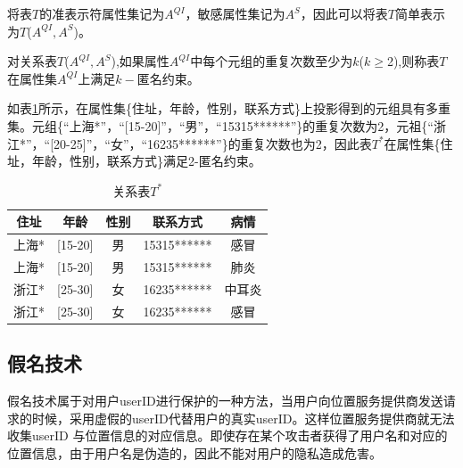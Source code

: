 将表$T$的准表示符属性集记为$A^{QI}$，敏感属性集记为$A^S$，因此可以将表$T$简单表示为$T$($A^{QI},A^S$)。

\begin{define}[k-匿名约束]
对关系表$T$($A^{QI},A^S$),如果属性$A^{QI}$中每个元组的重复次数至少为$k$($k\geq$2),则称表$T$在属性集$A^{QI}$上满足$k-$匿名约束。
\end{define}

如表\ref{k-anony-2}所示，在属性集\{住址，年龄，性别，联系方式\}上投影得到的元组具有多重集。元组\{“上海*”，“[15-20]”，“男”，“15315******”\}的重复次数为2，元祖\{“浙江*”，“[20-25]”，“女”，“16235******”\}的重复次数也为2，因此表$T^*$在属性集\{住址，年龄，性别，联系方式\}满足2-匿名约束。
\begin{table}[H]
\label{k-anony-2}
\centering  %
\begin{tabular}{ccccc}  %
\hline
住址 &年龄&性别 &联系方式&病情\\ \hline  %
上海*&[15-20]&男 &15315****** &感冒\\         %
上海*&[15-20]&男 &15315****** &肺炎\\        %
浙江*&[25-30]&女 &16235****** &中耳炎\\
浙江*&[25-30]&女 &16235****** &感冒\\ \hline
\end{tabular}
\caption{关系表$T^*$}
\end{table}
\subsection{假名技术}
假名技术属于对用户userID进行保护的一种方法，当用户向位置服务提供商发送请求的时候，采用虚假的userID代替用户的真实userID。这样位置服务提供商就无法收集userID 与位置信息的对应信息。即使存在某个攻击者获得了用户名和对应的位置信息，由于用户名是伪造的，因此不能对用户的隐私造成危害。

